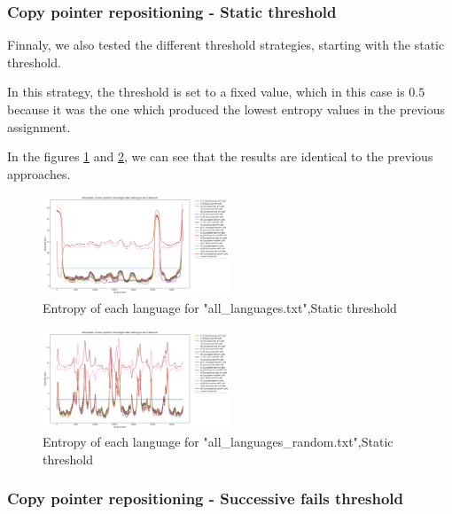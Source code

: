 \documentclass{article}
\begin{document}
\subsubsection{Copy pointer repositioning - Static threshold}
\label{subsubsec:results_locate_lang_static_threshold}

Finnaly, we also tested the different threshold strategies, starting with the static threshold.

In this strategy, the threshold is set to a fixed value, which in this case is $0.5$ because it was the one which produced the lowest entropy values in the previous assignment.

In the figures \ref{fig:all_languages_t_n} and \ref{fig:all_languages_random_t_n}, we can see that the results are identical to the previous approaches.

\begin{figure}
    \centering
    \includegraphics[width=0.5\textwidth]{../results/all_languages/-t_n:0.5.png}
    \caption{Entropy of each language for "all_languages.txt",Static threshold}
    \label{fig:all_languages_t_n}
\end{figure}

\begin{figure}
    \centering
    \includegraphics[width=0.5\textwidth]{../results/all_languages_random/-t_n:0.5.png}
    \caption{Entropy of each language for "all_languages_random.txt",Static threshold}
    \label{fig:all_languages_random_t_n}
\end{figure}

\subsubsection{Copy pointer repositioning - Successive fails threshold}
\label{subsubsec:results_locate_lang_successive_fails_threshold}
\end{document}
